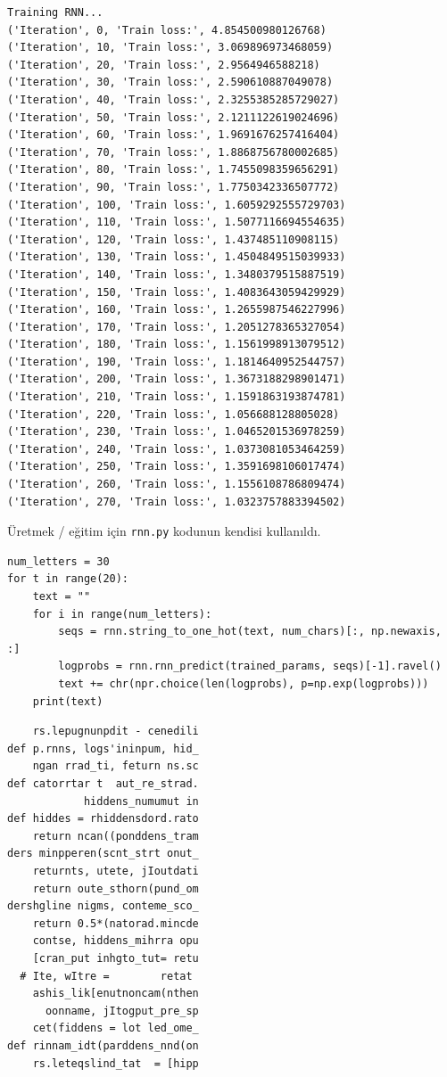 \documentclass[12pt,fleqn]{article}\usepackage{../../common}
\begin{document}
\begin{verbatim}
Training RNN...
('Iteration', 0, 'Train loss:', 4.854500980126768)
('Iteration', 10, 'Train loss:', 3.069896973468059)
('Iteration', 20, 'Train loss:', 2.9564946588218)
('Iteration', 30, 'Train loss:', 2.590610887049078)
('Iteration', 40, 'Train loss:', 2.3255385285729027)
('Iteration', 50, 'Train loss:', 2.1211122619024696)
('Iteration', 60, 'Train loss:', 1.9691676257416404)
('Iteration', 70, 'Train loss:', 1.8868756780002685)
('Iteration', 80, 'Train loss:', 1.7455098359656291)
('Iteration', 90, 'Train loss:', 1.7750342336507772)
('Iteration', 100, 'Train loss:', 1.6059292555729703)
('Iteration', 110, 'Train loss:', 1.5077116694554635)
('Iteration', 120, 'Train loss:', 1.437485110908115)
('Iteration', 130, 'Train loss:', 1.4504849515039933)
('Iteration', 140, 'Train loss:', 1.3480379515887519)
('Iteration', 150, 'Train loss:', 1.4083643059429929)
('Iteration', 160, 'Train loss:', 1.2655987546227996)
('Iteration', 170, 'Train loss:', 1.2051278365327054)
('Iteration', 180, 'Train loss:', 1.1561998913079512)
('Iteration', 190, 'Train loss:', 1.1814640952544757)
('Iteration', 200, 'Train loss:', 1.3673188298901471)
('Iteration', 210, 'Train loss:', 1.1591863193874781)
('Iteration', 220, 'Train loss:', 1.056688128805028)
('Iteration', 230, 'Train loss:', 1.0465201536978259)
('Iteration', 240, 'Train loss:', 1.0373081053464259)
('Iteration', 250, 'Train loss:', 1.3591698106017474)
('Iteration', 260, 'Train loss:', 1.1556108786809474)
('Iteration', 270, 'Train loss:', 1.0323757883394502)
\end{verbatim}

Üretmek / eğitim için \verb!rnn.py! kodunun kendisi kullanıldı.

\begin{verbatim}
num_letters = 30
for t in range(20):
    text = ""
    for i in range(num_letters):
        seqs = rnn.string_to_one_hot(text, num_chars)[:, np.newaxis, :]
        logprobs = rnn.rnn_predict(trained_params, seqs)[-1].ravel()
        text += chr(npr.choice(len(logprobs), p=np.exp(logprobs)))
    print(text)
\end{verbatim}

\begin{verbatim}
    rs.lepugnunpdit - cenedili
def p.rnns, logs'ininpum, hid_
    ngan rrad_ti, feturn ns.sc
def catorrtar t  aut_re_strad.
            hiddens_numumut in
def hiddes = rhiddensdord.rato
    return ncan((ponddens_tram
ders minpperen(scnt_strt onut_
    returnts, utete, jIoutdati
    return oute_sthorn(pund_om
dershgline nigms, conteme_sco_
    return 0.5*(natorad.mincde
    contse, hiddens_mihrra opu
    [cran_put inhgto_tut= retu
  # Ite, wItre =        retat 
    ashis_lik[enutnoncam(nthen
      oonname, jItogput_pre_sp
    cet(fiddens = lot led_ome_
def rinnam_idt(parddens_nnd(on
    rs.leteqslind_tat  = [hipp
\end{verbatim}
\end{document}
